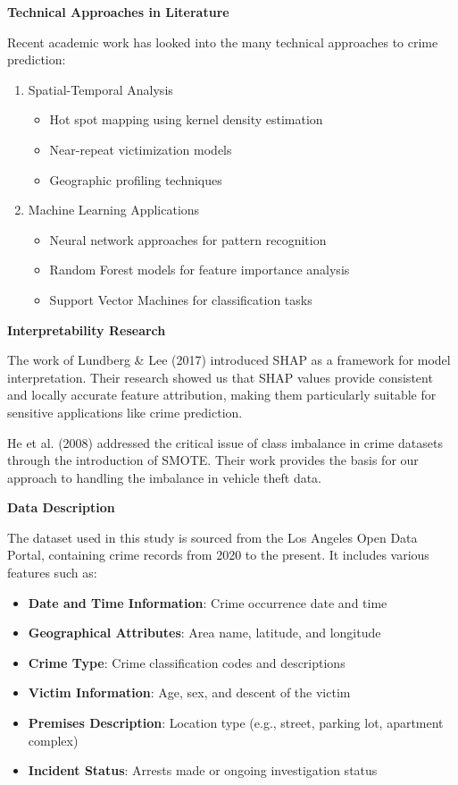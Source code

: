 \documentclass[
]{article}
\begin{document}
\textbf{Technical Approaches in Literature}

Recent academic work has looked into the many technical approaches to
crime prediction:

\begin{enumerate}
\def\labelenumi{\arabic{enumi}.}
\item
  Spatial-Temporal Analysis

  \begin{itemize}
  \item
    Hot spot mapping using kernel density estimation
  \item
    Near-repeat victimization models
  \item
    Geographic profiling techniques
  \end{itemize}
\item
  Machine Learning Applications

  \begin{itemize}
  \item
    Neural network approaches for pattern recognition
  \item
    Random Forest models for feature importance analysis
  \item
    Support Vector Machines for classification tasks
  \end{itemize}
\end{enumerate}

\textbf{Interpretability Research}

The work of Lundberg \& Lee (2017) introduced SHAP as a framework for
model interpretation. Their research showed us that SHAP values provide
consistent and locally accurate feature attribution, making them
particularly suitable for sensitive applications like crime prediction.

He et al. (2008) addressed the critical issue of class imbalance in
crime datasets through the introduction of SMOTE. Their work provides
the basis for our approach to handling the imbalance in vehicle theft
data.

\textbf{Data Description}

The dataset used in this study is sourced from the Los Angeles Open Data
Portal, containing crime records from 2020 to the present. It includes
various features such as:

\begin{itemize}
\item
  \textbf{Date and Time Information}: Crime occurrence date and time
\item
  \textbf{Geographical Attributes}: Area name, latitude, and longitude
\item
  \textbf{Crime Type}: Crime classification codes and descriptions
\item
  \textbf{Victim Information}: Age, sex, and descent of the victim
\item
  \textbf{Premises Description}: Location type (e.g., street, parking
  lot, apartment complex)
\item
  \textbf{Incident Status}: Arrests made or ongoing investigation status
\end{itemize}
\end{document}
